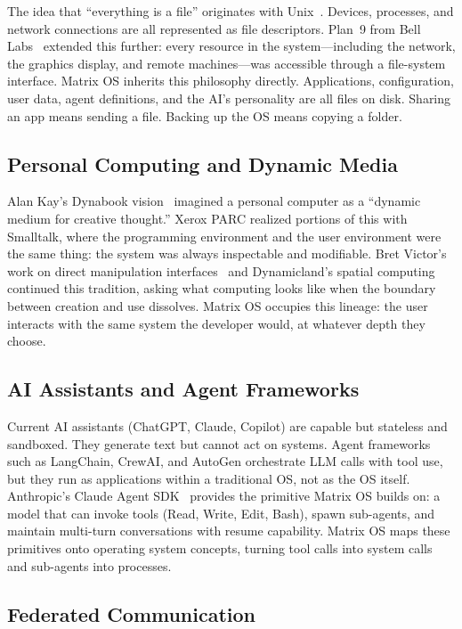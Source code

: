 \documentclass[11pt,a4paper]{article}
\begin{document}
The idea that ``everything is a file'' originates with Unix~\cite{mcilroy1978unix}. Devices, processes, and network connections are all represented as file descriptors. Plan~9 from Bell Labs~\cite{pike1995plan9} extended this further: every resource in the system---including the network, the graphics display, and remote machines---was accessible through a file-system interface. Matrix OS inherits this philosophy directly. Applications, configuration, user data, agent definitions, and the AI's personality are all files on disk. Sharing an app means sending a file. Backing up the OS means copying a folder.

\subsection{Personal Computing and Dynamic Media}

Alan Kay's Dynabook vision~\cite{kay1972dynabook} imagined a personal computer as a ``dynamic medium for creative thought.'' Xerox PARC realized portions of this with Smalltalk, where the programming environment and the user environment were the same thing: the system was always inspectable and modifiable. Bret Victor's work on direct manipulation interfaces~\cite{victor2012inventing} and Dynamicland's spatial computing~\cite{dynamicland2018} continued this tradition, asking what computing looks like when the boundary between creation and use dissolves. Matrix OS occupies this lineage: the user interacts with the same system the developer would, at whatever depth they choose.

\subsection{AI Assistants and Agent Frameworks}

Current AI assistants (ChatGPT, Claude, Copilot) are capable but stateless and sandboxed. They generate text but cannot act on systems. Agent frameworks such as LangChain, CrewAI, and AutoGen orchestrate LLM calls with tool use, but they run as applications within a traditional OS, not as the OS itself. Anthropic's Claude Agent SDK~\cite{anthropic2025sdk} provides the primitive Matrix OS builds on: a model that can invoke tools (Read, Write, Edit, Bash), spawn sub-agents, and maintain multi-turn conversations with resume capability. Matrix OS maps these primitives onto operating system concepts, turning tool calls into system calls and sub-agents into processes.

\subsection{Federated Communication}
\end{document}
